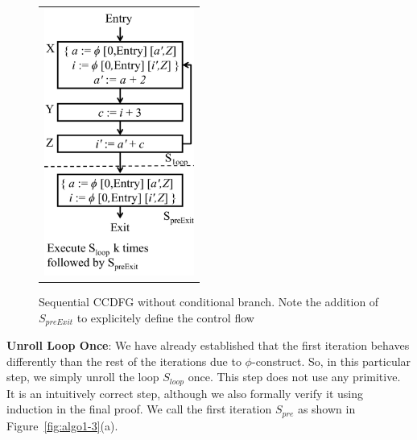 \begin{figure}[H]
\begin{center}
\begin{tabular}{c}
\includegraphics[height=3.45in]{fig-proposal/algorithm-after-removing-branches}
\end{tabular}
\end{center}
\caption{Sequential CCDFG without conditional branch. Note the addition of $S_{preExit}$ to explicitely define the control flow}
\label{fig:algo1-2}
\end{figure}

{\bf Unroll Loop Once}: We have already established that the first iteration behaves differently than the rest of the
iterations due to $\phi$-construct. So, in this particular step, we simply unroll the loop $S_{loop}$ once. This step does not use any primitive. It is an intuitively correct step, although we also formally verify it using induction in the final proof. We call the first iteration
$S_{pre}$ as shown in Figure~\ref{fig:algo1-3}(a).

